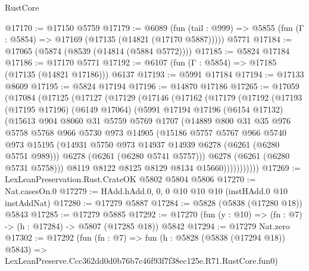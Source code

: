 \begin{lexlean}{RustCore}
\begin{coremodule}
@17170 := @17150 @5759
@17179 := @6089
    (fun (tail : @999) => @5855 (fun (Γ : @5854) => @17169 (@17135 (@14821 (@17170 @5887)))))
    @5771
@17184 := @17065 (@5874 (@8539 (@14814 (@5884 @5772))))
@17185 := @5824 @17184
@17186 := @17170 @5771
@17192 := @6107 (fun (Γ : @5854) => @17185 (@17135 (@14821 @17186))) @6137
@17193 := @5991 @17184
@17194 := @17133 @8609
@17195 := @5824 @17194
@17196 := @14870 @17186
@17265 := @17059
    (@17084
      (@17125
        (@17127
          (@17129
            (@17146
              (@17162
                (@17179
                  (@17192
                    (@17193
                      (@17195 @17196)
                      (@6149 @17064)
                      (@5991
                        @17194
                        @17196
                        (@6154 @17132)
                        (@15613
                          @904
                          @8060
                          @31
                          @5759
                          @5769
                          @1707
                          (@14889
                            @800
                            @31
                            @35
                            @976
                            @5758
                            @5768
                            @966
                            @5730
                            @973
                            @14905
                            (@15186
                              @5757
                              @5767
                              @966
                              @5740
                              @973
                              @15195
                              (@14931 @5750 @973 @14937 @14939 @6278 (@6261 (@6280 @5751 @989)))
                              @6278
                              (@6261 (@6280 @5741 @5757)))
                            @6278
                            (@6261 (@6280 @5731 @5758)))
                          @8119
                          @8122
                          @8125
                          @8129
                          @8134
                          @15660)))))))))))
@17269 := LexLeanPreservation.Rust.CrateOK @5802 @5804 @5806
@17270 := Nat.casesOn.{0}
@17279 := HAdd.hAdd.{0, 0, 0} @10 @10 @10 (instHAdd.{0} @10 instAddNat)
@17280 := @17279 @5887
@17284 := @5828 (@5838 (@17280 @18)) @5843
@17285 := @17279 @5885
@17292 := @17270 (fun (y : @10) => (fn : @7) -> (h : @17284) -> @5807 (@17285 @18)) @5842
@17294 := @17279 Nat.zero
@17302 := @17292
    (fun (fn : @7) =>
    fun (h : @5828 (@5838 (@17294 @18)) @5843) =>
    LexLeanPreserve.Ccc362dd0d0b76b7c46f93f7f38ec125e.R71.RustCore.fun0)

\end{coremodule}
\end{lexlean}
